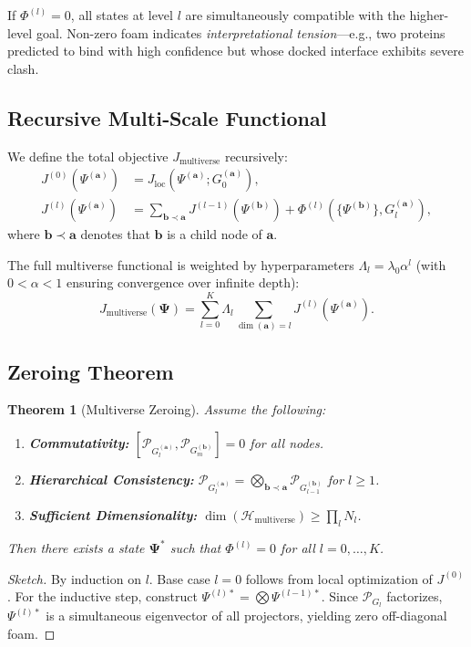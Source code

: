 \documentclass[11pt]{article}
\newtheorem{theorem}{Theorem}[section]
\newcommand{\cP}{\mathcal{P}}
\newcommand{\cH}{\mathcal{H}}
\begin{document}
If \(\Phi^{(l)} = 0\), all states at level \(l\) are simultaneously compatible with the higher-level goal. Non-zero foam indicates \emph{interpretational tension}---e.g., two proteins predicted to bind with high confidence but whose docked interface exhibits severe clash.

\subsection{Recursive Multi‑Scale Functional}

We define the total objective \(J_{\text{multiverse}}\) recursively:
\begin{align}
J^{(0)}(\Psi^{(\mathbf{a})}) &= J_{\text{loc}}(\Psi^{(\mathbf{a})}; G_0^{(\mathbf{a})}), \\
J^{(l)}(\Psi^{(\mathbf{a})}) &= \sum_{\mathbf{b} \prec \mathbf{a}} J^{(l-1)}(\Psi^{(\mathbf{b})}) + \Phi^{(l)}(\{\Psi^{(\mathbf{b})}\}, G_l^{(\mathbf{a})}),
\end{align}
where \(\mathbf{b} \prec \mathbf{a}\) denotes that \(\mathbf{b}\) is a child node of \(\mathbf{a}\).

The full multiverse functional is weighted by hyperparameters \(\Lambda_l = \lambda_0 \alpha^l\) (with \(0<\alpha<1\) ensuring convergence over infinite depth):
\begin{equation}
\boxed{J_{\text{multiverse}}(\mathbf{\Psi}) = \sum_{l=0}^{K} \Lambda_l \sum_{\dim(\mathbf{a})=l} J^{(l)}(\Psi^{(\mathbf{a})}).}
\end{equation}

\subsection{Zeroing Theorem}

\begin{theorem}[Multiverse Zeroing]
Assume the following:
\begin{enumerate}[label=(\arabic*)]
    \item \textbf{Commutativity:} \([\cP_{G_l^{(\mathbf{a})}}, \cP_{G_m^{(\mathbf{b})}}] = 0\) for all nodes.
    \item \textbf{Hierarchical Consistency:} \(\cP_{G_l^{(\mathbf{a})}} = \bigotimes_{\mathbf{b}\prec\mathbf{a}} \cP_{G_{l-1}^{(\mathbf{b})}}\) for \(l \ge 1\).
    \item \textbf{Sufficient Dimensionality:} \(\dim(\cH_{\text{multiverse}}) \ge \prod_l N_l\).
\end{enumerate}
Then there exists a state \(\mathbf{\Psi}^*\) such that \(\Phi^{(l)} = 0\) for all \(l = 0,\dots,K\).
\end{theorem}
\begin{proof}[Sketch]
By induction on \(l\). Base case \(l=0\) follows from local optimization of \(J^{(0)}\). For the inductive step, construct \(\Psi^{(l)*} = \bigotimes \Psi^{(l-1)*}\). Since \(\cP_{G_l}\) factorizes, \(\Psi^{(l)*}\) is a simultaneous eigenvector of all projectors, yielding zero off-diagonal foam.
\end{proof}
\end{document}
